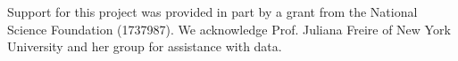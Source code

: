 


\begin{acks}
Support for this project was provided in part by a grant from the National Science Foundation (1737987). We acknowledge Prof. Juliana Freire of New York University and her group for assistance with data.
\end{acks}

